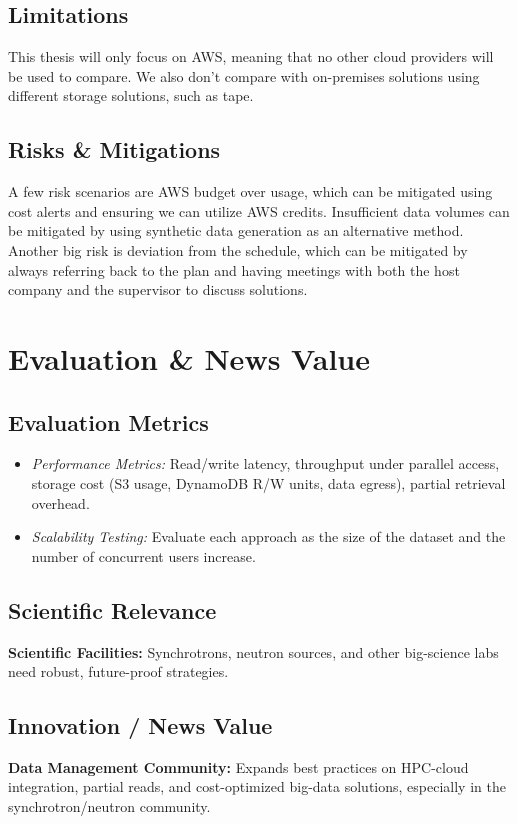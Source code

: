 \documentclass{article}
\begin{document}
\subsection{Limitations}
This thesis will only focus on AWS, meaning that no other cloud providers will be used to compare. We also don't compare with on-premises solutions using different storage solutions, such as tape.

\subsection{Risks \& Mitigations}
A few risk scenarios are AWS budget over usage, which can be mitigated using cost alerts and ensuring we can utilize AWS credits. Insufficient data volumes can be mitigated by using synthetic data generation as an alternative method. Another big risk is deviation from the schedule, which can be mitigated by always referring back to the plan and having meetings with both the host company and the supervisor to discuss solutions. 



\section{Evaluation \& News Value}

\subsection{Evaluation Metrics}
\begin{itemize}
    \item \emph{Performance Metrics:} Read/write latency, throughput under parallel access, storage cost (S3 usage, DynamoDB R/W units, data egress), partial retrieval overhead.
    \item \emph{Scalability Testing:} Evaluate each approach as the size of the dataset and the number of concurrent users increase.
\end{itemize}


\subsection{Scientific Relevance}
\textbf{Scientific Facilities:} Synchrotrons, neutron sources, and other big-science labs need robust, future-proof strategies.


\subsection{Innovation / News Value}
\textbf{Data Management Community:} Expands best practices on HPC-cloud integration, partial reads, and cost-optimized big-data solutions, especially in the synchrotron/neutron community.
\end{document}
